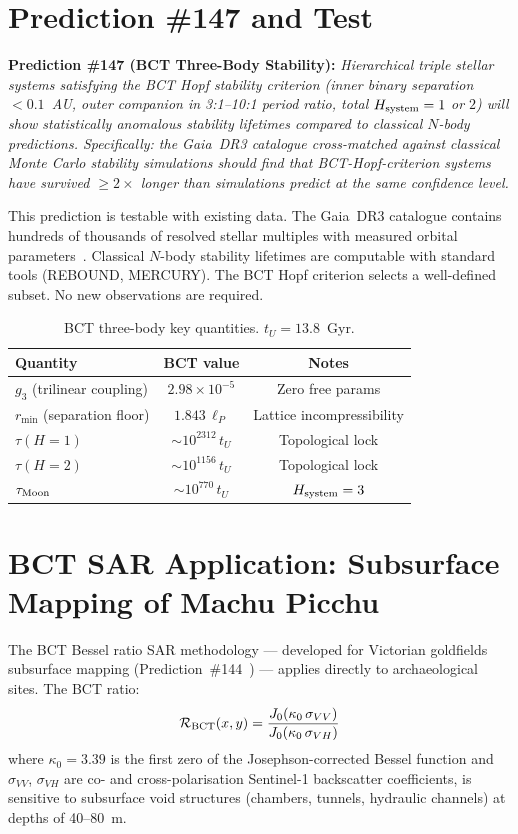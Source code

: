 \documentclass[twocolumn,10pt]{article}
\begin{document}
\section{Prediction \#147 and Test}

\textbf{Prediction \#147 (BCT Three-Body Stability):}
\textit{Hierarchical triple stellar systems satisfying the BCT Hopf stability criterion 
(inner binary separation $< 0.1$~AU, outer companion in 3:1--10:1 period ratio, total 
$H_{\rm system} = 1$ or $2$) will show statistically anomalous stability lifetimes compared 
to classical $N$-body predictions. Specifically: the Gaia~DR3 catalogue cross-matched against 
classical Monte Carlo stability simulations should find that BCT-Hopf-criterion systems have 
survived $\geq 2\times$ longer than simulations predict at the same confidence level.}

This prediction is testable with existing data. The Gaia~DR3 catalogue contains hundreds of 
thousands of resolved stellar multiples with measured orbital parameters~\cite{gaia_dr3}. 
Classical $N$-body stability lifetimes are computable with standard tools (REBOUND, 
MERCURY). The BCT Hopf criterion selects a well-defined subset. No new observations are 
required.

\begin{table}[h]
\begin{tabular}{@{}lcc@{}}
\toprule
Quantity & BCT value & Notes \\
\midrule
$g_3$ (trilinear coupling) & $2.98\times10^{-5}$ & Zero free params \\
$r_{\min}$ (separation floor) & $1.843\,\ell_P$ & Lattice incompressibility \\
$\tau(H=1)$ & $\sim 10^{2312}\,t_U$ & Topological lock \\
$\tau(H=2)$ & $\sim 10^{1156}\,t_U$ & Topological lock \\
$\tau_{\rm Moon}$ & $\sim 10^{770}\,t_U$ & $H_{\rm system}=3$ \\
\bottomrule
\end{tabular}
\caption{BCT three-body key quantities. $t_U = 13.8$~Gyr.}
\end{table}

\section{BCT SAR Application: Subsurface Mapping of Machu Picchu}

The BCT Bessel ratio SAR methodology --- developed for Victorian goldfields subsurface 
mapping (Prediction~\#144~\cite{bct_l102}) --- applies directly to archaeological 
sites. The BCT ratio:
%
\begin{equation}
\mathcal{R}_{\rm BCT}(x,y) = \frac{J_0(\kappa_0\,\sigma_{VV})}{J_0(\kappa_0\,\sigma_{VH})}
\end{equation}
%
where $\kappa_0 = 3.39$ is the first zero of the Josephson-corrected Bessel function and 
$\sigma_{VV}$, $\sigma_{VH}$ are co- and cross-polarisation Sentinel-1 backscatter 
coefficients, is sensitive to subsurface void structures (chambers, tunnels, hydraulic 
channels) at depths of 40--80~m.
\end{document}
